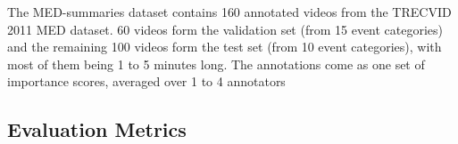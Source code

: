 The MED-summaries
dataset contains 160 annotated videos from the TRECVID
2011 MED dataset. 60 videos form the validation set (from
15 event categories) and the remaining 100 videos form the
test set (from 10 event categories), with most of them being
1 to 5 minutes long. The annotations come as one set of
importance scores, averaged over 1 to 4 annotators


\subsection{Evaluation Metrics}
\label{subsec:rel-evaluation}